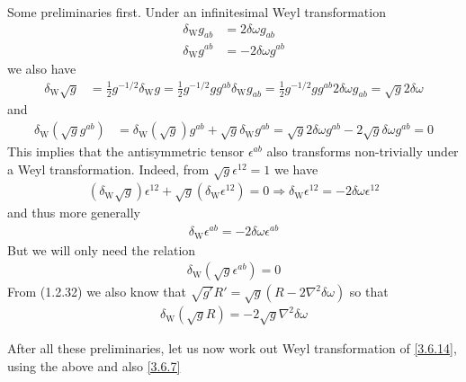 \begin{tcolorbox}[breakable]
		Some preliminaries first. Under an infinitesimal Weyl transformation
		\begin{align}
			\delta_{\mathrm{W}} g_{a b} &= 2 \delta \omega g_{a b} \\
			\delta_{\mathrm{W}} g^{a b} &= -2 \delta \omega g^{a b}
		\end{align}
		we also have
		\begin{align}
			\delta_{\mathrm{W}} \sqrt{g} &= \frac{1}{2} g^{-1/2} \delta_{\mathrm{W}} g = \frac{1}{2} g^{-1/2} g g^{a b} \delta_{\mathrm{W}} g_{a b} = \frac{1}{2} g^{-1/2} g g^{a b} 2 \delta \omega g_{a b} = \sqrt{g} 2 \delta \omega
		\end{align}
		and
		\begin{align}
			\delta_{\mathrm{W}}\left(\sqrt{g} g^{a b}\right) &= \delta_{\mathrm{W}}(\sqrt{g}) g^{a b} + \sqrt{g} \delta_{\mathrm{W}} g^{a b} = \sqrt{g} 2 \delta \omega g^{a b} - 2 \sqrt{g} \delta \omega g^{a b} = 0
		\end{align}
		This implies that the antisymmetric tensor $\epsilon^{a b}$ also transforms non-trivially under a Weyl transformation. Indeed, from $\sqrt{g} \epsilon^{12}=1$ we have
		\begin{align}
			\left(\delta_{\mathrm{W}} \sqrt{g}\right) \epsilon^{12} + \sqrt{g}\left(\delta_{\mathrm{W}} \epsilon^{12}\right) = 0 \Rightarrow \delta_{\mathrm{W}} \epsilon^{12} = -2 \delta \omega \epsilon^{12}
		\end{align}
		and thus more generally
		\begin{align}
			\delta_{\mathrm{W}} \epsilon^{a b} = -2 \delta \omega \epsilon^{a b}
		\end{align}
		But we will only need the relation
		\begin{align}
			\delta_{\mathrm{W}}\left(\sqrt{g} \epsilon^{a b}\right) = 0
		\end{align}
		From (1.2.32) we also know that $\sqrt{g'} R' = \sqrt{g}(R - 2 \nabla^2 \delta \omega)$ so that
		\begin{align}
			\delta_{\mathrm{W}}(\sqrt{g} R) = -2 \sqrt{g} \nabla^2 \delta \omega
		\end{align}
		
		After all these preliminaries, let us now work out Weyl transformation of \eqref{3.6.14}, using the above and also \eqref{3.6.7}
		

\end{tcolorbox}
